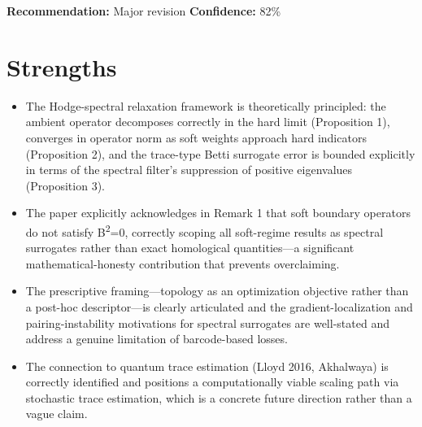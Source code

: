 \documentclass[11pt]{article}
\begin{document}
\textbf{Recommendation:} Major revision \quad \textbf{Confidence:} 82\%\\

\section*{Strengths}
\begin{itemize}[leftmargin=*]
  \item The Hodge-spectral relaxation framework is theoretically principled: the ambient operator decomposes correctly in the hard limit (Proposition 1), converges in operator norm as soft weights approach hard indicators (Proposition 2), and the trace-type Betti surrogate error is bounded explicitly in terms of the spectral filter's suppression of positive eigenvalues (Proposition 3).
  \item The paper explicitly acknowledges in Remark 1 that soft boundary operators do not satisfy B\textsuperscript{2}=0, correctly scoping all soft-regime results as spectral surrogates rather than exact homological quantities---a significant mathematical-honesty contribution that prevents overclaiming.
  \item The prescriptive framing---topology as an optimization objective rather than a post-hoc descriptor---is clearly articulated and the gradient-localization and pairing-instability motivations for spectral surrogates are well-stated and address a genuine limitation of barcode-based losses.
  \item The connection to quantum trace estimation (Lloyd 2016, Akhalwaya) is correctly identified and positions a computationally viable scaling path via stochastic trace estimation, which is a concrete future direction rather than a vague claim.
\end{itemize}
\end{document}
